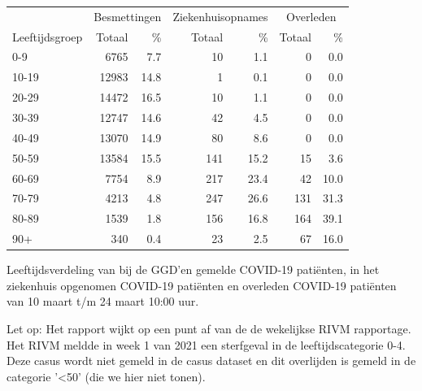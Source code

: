 \documentclass[
  english,
  man,floatsintext]{apa6}
\begin{document}
\begin{table}
\centering\begingroup\fontsize{11}{13}\selectfont

\begin{threeparttable}
\begin{tabular}{lrrrrrr}
\toprule
\multicolumn{1}{c}{ } & \multicolumn{2}{c}{Besmettingen} & \multicolumn{2}{c}{Ziekenhuisopnames} & \multicolumn{2}{c}{Overleden} \\
\cmidrule(l{3pt}r{3pt}){2-3} \cmidrule(l{3pt}r{3pt}){4-5} \cmidrule(l{3pt}r{3pt}){6-7}
Leeftijdsgroep & Totaal & \% & Totaal & \% & Totaal & \%\\
\midrule
0-9 & 6765 & 7.7 & 10 & 1.1 & 0 & 0.0\\
10-19 & 12983 & 14.8 & 1 & 0.1 & 0 & 0.0\\
20-29 & 14472 & 16.5 & 10 & 1.1 & 0 & 0.0\\
30-39 & 12747 & 14.6 & 42 & 4.5 & 0 & 0.0\\
40-49 & 13070 & 14.9 & 80 & 8.6 & 0 & 0.0\\
50-59 & 13584 & 15.5 & 141 & 15.2 & 15 & 3.6\\
60-69 & 7754 & 8.9 & 217 & 23.4 & 42 & 10.0\\
70-79 & 4213 & 4.8 & 247 & 26.6 & 131 & 31.3\\
80-89 & 1539 & 1.8 & 156 & 16.8 & 164 & 39.1\\
90+ & 340 & 0.4 & 23 & 2.5 & 67 & 16.0\\
\bottomrule
\end{tabular}
\begin{tablenotes}
\item[1] Leeftijdsverdeling van bij de GGD’en gemelde COVID-19 patiënten, in het ziekenhuis opgenomen COVID-19 patiënten en overleden COVID-19 patiënten van 10 maart t/m 24 maart 10:00 uur.
\item[2] Let op: Het rapport wijkt op een punt af van de de wekelijkse RIVM rapportage. Het RIVM meldde in week 1 van 2021 een sterfgeval in de leeftijdscategorie 0-4. Deze casus wordt niet gemeld in de casus dataset en dit overlijden is gemeld in de categorie '<50' (die we hier niet tonen).
\end{tablenotes}
\end{threeparttable}
\endgroup{}
\end{table}

\newpage
\end{document}
